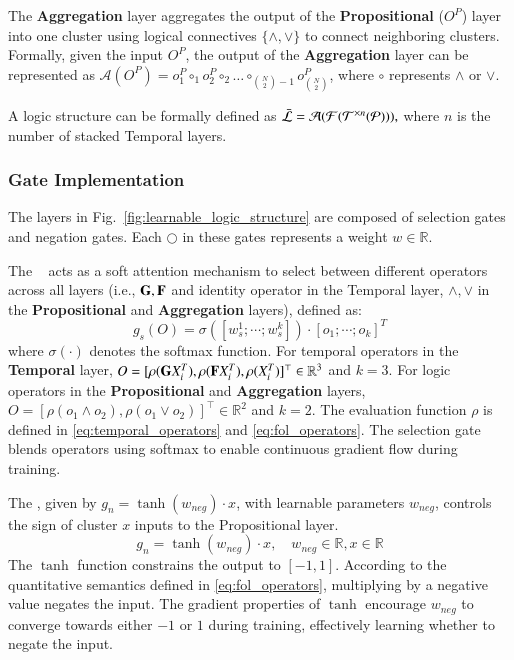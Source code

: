 The \textbf{Aggregation} layer aggregates the output of the \textbf{Propositional} ($O^P$) layer into one cluster using logical connectives $\{\land, \lor\}$ to connect neighboring clusters. Formally, given the input $O^P$, the output of the \textbf{Aggregation} layer can be represented as $\mathcal{A}(O^P) = o^P_1 \circ_1 o^P_2 \circ_2 \ldots \circ_{{N \choose 2} - 1} o^P_{N \choose 2}$, where $\circ$ represents $\land$ or $\lor$.

A logic structure can be formally defined as
$
    \bar{\mathcal{L}}  = \mathcal{A}(\mathcal{F}(\mathcal{T}^{\times n}(\mathcal{P}))),
$
where $n$ is the number of stacked Temporal layers.

\subsubsection{Gate Implementation}
\label{sec:gate_implementation}
The layers in Fig.~\ref{fig:learnable_logic_structure} are composed of selection gates and negation gates. Each $\bigcirc$ in these gates represents a weight $w \in \mathbb{R}$.

The \selectiongate~ acts as a soft attention mechanism to select between different operators across all layers (i.e., $\mathbf{G}, \mathbf{F}$ and identity operator in the Temporal layer, $\land, \lor$ in the \textbf{Propositional} and \textbf{Aggregation} layers), defined as:
\begin{equation}
    g_s(O) = \sigma([w_s^1 ; \cdots ; w_s^k]) \cdot [o_1 ; \cdots ; o_k]^T
\end{equation}
where $\sigma(\cdot)$ denotes the softmax function. For temporal operators in the \textbf{Temporal} layer, $O = [\rho(\mathbf{G} X_i^T), \rho(\mathbf{F} X_i^T), \rho(X_i^T)]^\top \in \mathbb{R}^3$ and $k=3$.
For logic operators in the \textbf{Propositional} and \textbf{Aggregation} layers, $O = [\rho(o_1 \land o_2), \rho(o_1 \lor o_2)]^\top \in \mathbb{R}^2$ and $k=2$. The evaluation function $\rho$ is defined in  \eqref{eq:temporal_operators} and \eqref{eq:fol_operators}. The selection gate blends operators using softmax to enable continuous gradient flow during training.

The \negationgate, given by $g_n = \tanh(w_{neg}) \cdot x$, with learnable parameters $w_{neg}$, controls the sign of cluster $x$ inputs to the Propositional layer.
\begin{equation}
    g_n = \tanh(w_{neg}) \cdot x, \quad w_{neg} \in \mathbb{R}, x \in \mathbb{R}
\end{equation}
The $\tanh$ function constrains the output to $[-1, 1]$. According to the quantitative semantics defined in \eqref{eq:fol_operators}, multiplying by a negative value negates the input. The gradient properties of $\tanh$ encourage $w_{neg}$ to converge towards either $-1$ or $1$ during training, effectively learning whether to negate the input.

